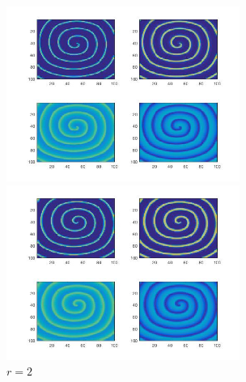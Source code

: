 \documentclass[
pdflinks,
]{xjtuthesis}
\begin{document}
\begin{figure}[!ht]
\begin{minipage}[!ht]{0.5\linewidth}
\centering
\includegraphics[width=3.0in]{figures/p10r1_1.jpg}
\caption{$r=1$}
\end{minipage}%
\begin{minipage}[!ht]{0.5\linewidth}
\centering
\includegraphics[width=3.0in]{figures/p10r2_1.jpg}
\caption{$r=2$}
\end{minipage}
\end{figure}
\end{document}
